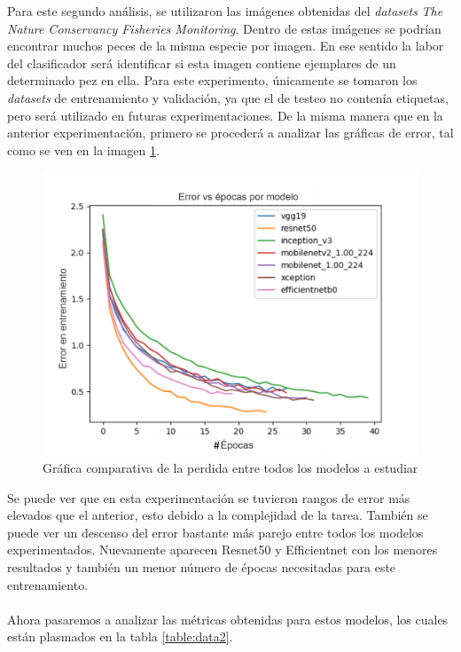 Para este segundo análisis, se  utilizaron las imágenes obtenidas del \textit{datasets} 
\textit{The Nature Conservancy Fisheries Monitoring}. Dentro de estas imágenes se podrían 
encontrar muchos peces de la misma especie por imagen. En ese sentido la labor del 
clasificador será identificar si esta imagen contiene ejemplares de un determinado 
pez en ella. Para este experimento, únicamente se tomaron los \textit{datasets} de 
entrenamiento y validación, ya que el de testeo no contenía etiquetas, pero será 
utilizado en futuras experimentaciones.  De la misma manera que en la anterior 
experimentación, primero se procederá a analizar las gráficas de error, tal como se 
ven en la imagen \ref{fig:losses2}.
\begin{figure}[h!]
\includegraphics[width=1\textwidth]{images/loss2.png}
\centering
\caption{Gráfica comparativa de la perdida entre todos los modelos a estudiar}
\label{fig:losses2}
\end{figure}
Se puede ver que en esta experimentación se tuvieron rangos de error más elevados que el anterior, esto debido a la complejidad de la tarea. También se puede ver un descenso del error bastante más parejo entre todos los modelos experimentados. Nuevamente aparecen Resnet50 y Efficientnet con los menores resultados y también un menor número de épocas necesitadas para este entrenamiento.\\\\
Ahora pasaremos a analizar las métricas obtenidas para estos modelos, los cuales están plasmados en la tabla \ref{table:data2}.
\newpage
